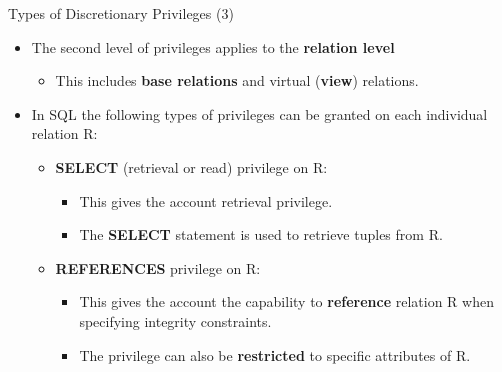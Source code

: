 \begin{frame}{Types of Discretionary Privileges (3)}
    \Large %
    
    \begin{itemize}
        \vspace{-0.5cm} %
        
        \item The second level of privileges applies to the \textbf{relation level}
        
        \begin{itemize}
            \large
            \setlength{\itemsep}{0.1cm}
            \item This includes \textbf{base relations} and virtual (\textbf{view}) relations.
        \end{itemize}
        
        \vspace{0.2cm} %
        
        \item In SQL the following types of privileges can be granted on each individual relation R:
        
        \begin{itemize}
            \large %
            \setlength{\itemsep}{0.2cm}
            
            \item \textbf{SELECT} (retrieval or read) privilege on R:
            
            \begin{itemize}
                \normalsize %
                \setlength{\itemsep}{0.1cm}
                \item This gives the account retrieval privilege.
                \item The \textbf{SELECT} statement is used to retrieve tuples from R.
            \end{itemize}
            
            \item \textbf{REFERENCES} privilege on R:
            
            \begin{itemize}
                \normalsize 
                \setlength{\itemsep}{0.1cm}
                \item This gives the account the capability to \textbf{reference} relation R when specifying integrity constraints.
                \item The privilege can also be \textbf{restricted} to specific attributes of R.
            \end{itemize}
            
        \end{itemize}
        
    \end{itemize}
\end{frame}


